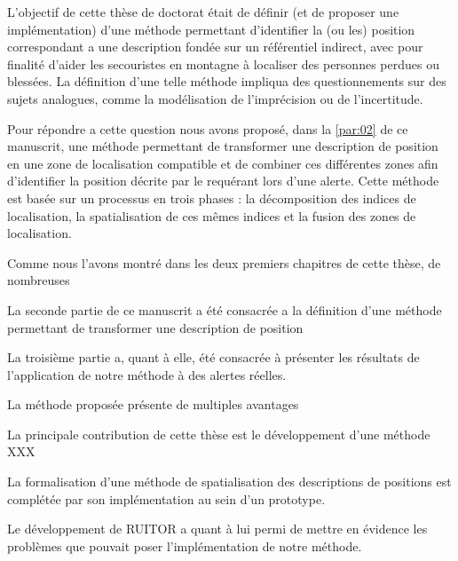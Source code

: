 

L'objectif de cette thèse de doctorat était de définir (et de proposer
une implémentation) d'une méthode permettant d'identifier la (ou les)
position correspondant a une description fondée sur un référentiel
indirect, avec pour finalité d'aider les secouristes en montagne à
localiser des personnes perdues ou blessées. La définition d'une telle
méthode impliqua des questionnements sur des sujets analogues, comme
la modélisation de l'imprécision ou de l'incertitude.

Pour répondre a cette question nous avons proposé, dans la
\autoref{par:02} de ce manuscrit, une méthode permettant de
transformer une description de position en une zone de localisation
compatible et de combiner ces différentes zones afin d’identifier la
position décrite par le requérant lors d'une alerte. Cette méthode est
basée sur un processus en trois phases : la décomposition des indices
de localisation, la spatialisation de ces mêmes indices et la fusion
des zones de localisation.



Comme nous l'avons montré dans les deux premiers chapitres de cette
thèse, de nombreuses

La seconde partie de ce manuscrit a été consacrée a la définition
d'une méthode permettant de transformer une description de position



La troisième partie a, quant à elle, été consacrée à présenter les
résultats de l’application de notre méthode à des alertes
réelles. 

La méthode proposée présente de multiples avantages



La principale contribution de cette thèse est le développement d'une
méthode XXX




La formalisation d'une méthode de spatialisation des descriptions de
positions est complétée par son implémentation au sein d'un prototype.





Le développement de RUITOR a quant à lui permi de mettre en évidence
les problèmes que pouvait poser l'implémentation de notre méthode.

